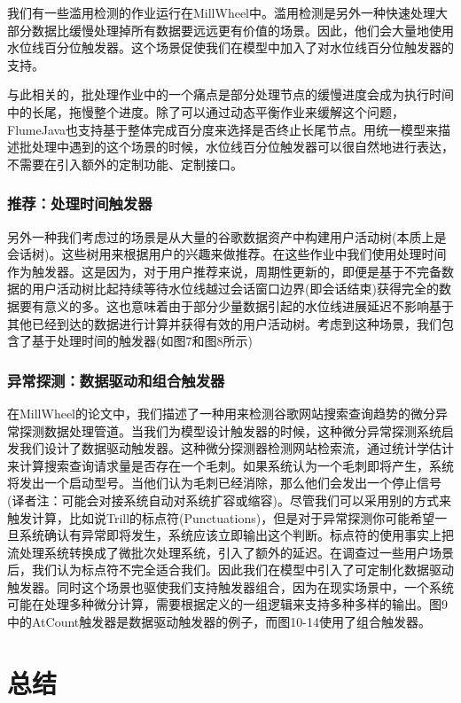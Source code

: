 \documentclass[oneside]{ctexbook}
\begin{document}
我们有一些滥用检测的作业运行在MillWheel中。滥用检测是另外一种快速处理大部分数据比缓慢处理掉所有数据要远远更有价值的场景。因此，他们会大量地使用水位线百分位触发器。这个场景促使我们在模型中加入了对水位线百分位触发器的支持。

与此相关的，批处理作业中的一个痛点是部分处理节点的缓慢进度会成为执行时间中的长尾，拖慢整个进度。除了可以通过动态平衡作业来缓解这个问题，FlumeJava也支持基于整体完成百分度来选择是否终止长尾节点。用统一模型来描述批处理中遇到的这个场景的时候，水位线百分位触发器可以很自然地进行表达，不需要在引入额外的定制功能、定制接口。

\subsubsection{推荐：处理时间触发器}

另外一种我们考虑过的场景是从大量的谷歌数据资产中构建用户活动树(本质上是会话树)。这些树用来根据用户的兴趣来做推荐。在这些作业中我们使用处理时间作为触发器。这是因为，对于用户推荐来说，周期性更新的，即便是基于不完备数据的用户活动树比起持续等待水位线越过会话窗口边界(即会话结束)获得完全的数据要有意义的多。这也意味着由于部分少量数据引起的水位线进展延迟不影响基于其他已经到达的数据进行计算并获得有效的用户活动树。考虑到这种场景，我们包含了基于处理时间的触发器(如图7和图8所示)

\subsubsection{异常探测：数据驱动和组合触发器}

在MillWheel的论文中，我们描述了一种用来检测谷歌网站搜索查询趋势的微分异常探测数据处理管道。当我们为模型设计触发器的时候，这种微分异常探测系统启发我们设计了数据驱动触发器。这种微分探测器检测网站检索流，通过统计学估计来计算搜索查询请求量是否存在一个毛刺。如果系统认为一个毛刺即将产生，系统将发出一个启动型号。当他们认为毛刺已经消除，那么他们会发出一个停止信号(译者注：可能会对接系统自动对系统扩容或缩容)。尽管我们可以采用别的方式来触发计算，比如说Trill的标点符(Punctuations)，但是对于异常探测你可能希望一旦系统确认有异常即将发生，系统应该立即输出这个判断。标点符的使用事实上把流处理系统转换成了微批次处理系统，引入了额外的延迟。在调查过一些用户场景后，我们认为标点符不完全适合我们。因此我们在模型中引入了可定制化数据驱动触发器。同时这个场景也驱使我们支持触发器组合，因为在现实场景中，一个系统可能在处理多种微分计算，需要根据定义的一组逻辑来支持多种多样的输出。图9中的AtCount触发器是数据驱动触发器的例子，而图10-14使用了组合触发器。

\section{总结}
\end{document}
